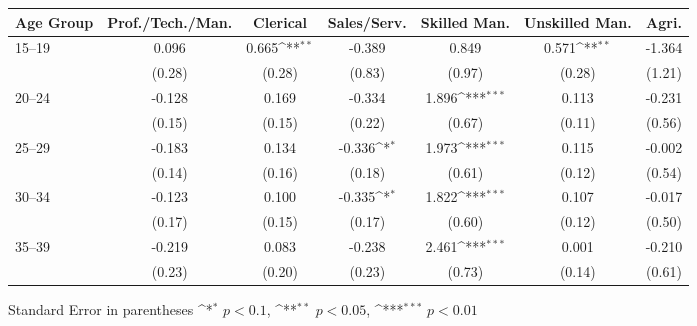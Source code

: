 \def\sym#1{\ifmmode^{#1}\else\(^{#1}\)\fi}
\renewcommand{\arraystretch}{1.4}
\small
\setlength{\tabcolsep}{4pt}

\begin{flushleft}
\begin{tabular}{@{}p{4cm}*{6}{c}@{}}
\hline\hline
Age Group & Prof./Tech./Man. & Clerical & Sales/Serv. & Skilled Man. & Unskilled Man. & Agri. \\
\hline
15--19 & 0.096 & 0.665\sym{**} & -0.389 & 0.849 & 0.571\sym{**} & -1.364 \\
    & (0.28) & (0.28) & (0.83) & (0.97) & (0.28) & (1.21) \\
\hline
20--24                 &      -0.128         &       0.169         &      -0.334         &       1.896\sym{***}&       0.113         &      -0.231         \\
                    &      (0.15)         &      (0.15)         &      (0.22)         &      (0.67)         &      (0.11)         &      (0.56)         \\
\hline
25--29                 &      -0.183         &       0.134         &      -0.336\sym{*}  &       1.973\sym{***}&       0.115         &      -0.002         \\
                    &      (0.14)         &      (0.16)         &      (0.18)         &      (0.61)         &      (0.12)         &      (0.54)         \\
\hline
30--34                 &      -0.123         &       0.100         &      -0.335\sym{*}  &       1.822\sym{***}&       0.107         &      -0.017         \\
                    &      (0.17)         &      (0.15)         &      (0.17)         &      (0.60)         &      (0.12)         &      (0.50)         \\
\hline
35--39                 &      -0.219         &       0.083         &      -0.238         &       2.461\sym{***}&       0.001         &      -0.210         \\
                    &      (0.23)         &      (0.20)         &      (0.23)         &      (0.73)         &      (0.14)         &      (0.61)         \\
\hline
\midrule
\end{tabular}
\vspace{4pt}
\noindent\footnotesize
Standard Error in parentheses \sym{*} \(p<0.1\), \sym{**} \(p<0.05\), \sym{***} \(p<0.01\)\\

\end{flushleft}